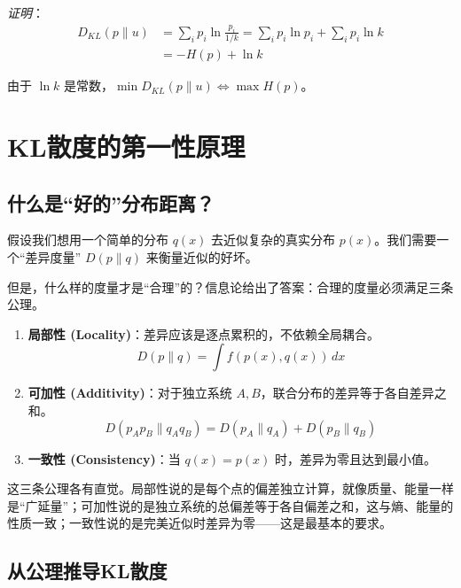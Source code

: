 \textit{证明}：
\begin{align}
D_{KL}(p \| u) &= \sum_i p_i \ln \frac{p_i}{1/k} = \sum_i p_i \ln p_i + \sum_i p_i \ln k \\
&= -H(p) + \ln k
\end{align}

由于 $\ln k$ 是常数，$\min D_{KL}(p \| u) \Leftrightarrow \max H(p)$。

\section{KL散度的第一性原理}

\subsection{什么是“好的”分布距离？}

假设我们想用一个简单的分布 $q(x)$ 去近似复杂的真实分布 $p(x)$。我们需要一个“差异度量” $D(p \| q)$ 来衡量近似的好坏。

但是，什么样的度量才是“合理”的？信息论给出了答案：合理的度量必须满足三条公理。

\begin{keyformula}[title={信息距离的三条公理 (Shore \& Johnson, 1980)}]
\begin{enumerate}
    \item \textbf{局部性 (Locality)}：差异应该是逐点累积的，不依赖全局耦合。
    \[
    D(p \| q) = \int f(p(x), q(x)) \, dx
    \]
    
    \item \textbf{可加性 (Additivity)}：对于独立系统 $A, B$，联合分布的差异等于各自差异之和。
    \[
    D(p_A p_B \| q_A q_B) = D(p_A \| q_A) + D(p_B \| q_B)
    \]
    
    \item \textbf{一致性 (Consistency)}：当 $q(x) = p(x)$ 时，差异为零且达到最小值。
\end{enumerate}
\end{keyformula}

\begin{physicalmeaning}
这三条公理各有直觉。局部性说的是每个点的偏差独立计算，就像质量、能量一样是“广延量”；可加性说的是独立系统的总偏差等于各自偏差之和，这与熵、能量的性质一致；一致性说的是完美近似时差异为零——这是最基本的要求。
\end{physicalmeaning}

\subsection{从公理推导KL散度}

